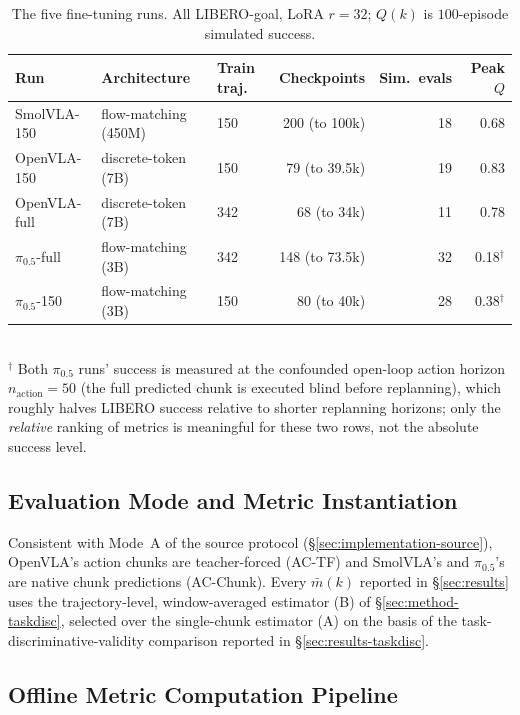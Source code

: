 \documentclass[11pt]{article}
\numberwithin{equation}{section}
\numberwithin{table}{section}
\numberwithin{figure}{section}
\begin{document}
\begin{table}[h]
\centering
\caption{The five fine-tuning runs. All LIBERO-goal, LoRA $r{=}32$; $Q(k)$ is $100$-episode simulated
success.}
\label{tab:runs}
\begin{tabular}{lllrrr}
\toprule
Run & Architecture & Train traj. & Checkpoints & Sim.\ evals & Peak $Q$ \\
\midrule
SmolVLA-150      & flow-matching (450M) & 150 & 200 (to 100k) & 18 & 0.68 \\
OpenVLA-150      & discrete-token (7B)  & 150 & 79 (to 39.5k) & 19 & 0.83 \\
OpenVLA-full     & discrete-token (7B)  & 342 & 68 (to 34k)   & 11 & 0.78 \\
$\pi_{0.5}$-full & flow-matching (3B)   & 342 & 148 (to 73.5k)& 32 & 0.18$^\dagger$ \\
$\pi_{0.5}$-150  & flow-matching (3B)   & 150 & 80 (to 40k)   & 28 & 0.38$^\dagger$ \\
\bottomrule
\end{tabular}
\\[2pt]
{\footnotesize $^\dagger$ Both $\pi_{0.5}$ runs' success is measured at the confounded open-loop action
horizon $n_{\mathrm{action}}{=}50$ (the full predicted chunk is executed blind before replanning), which
roughly halves LIBERO success relative to shorter replanning horizons; only the \emph{relative} ranking
of metrics is meaningful for these two rows, not the absolute success level.}
\end{table}

\subsection{Evaluation Mode and Metric Instantiation}
\label{sec:implementation-mode}

Consistent with Mode~A of the source protocol (\S\ref{sec:implementation-source}), OpenVLA's action
chunks are teacher-forced (AC-TF) and SmolVLA's and $\pi_{0.5}$'s are native chunk predictions
(AC-Chunk). Every $\bar m(k)$ reported in \S\ref{sec:results} uses the trajectory-level, window-averaged
estimator (B) of \S\ref{sec:method-taskdisc}, selected over the single-chunk estimator (A) on the basis
of the task-discriminative-validity comparison reported in \S\ref{sec:results-taskdisc}.

\subsection{Offline Metric Computation Pipeline}
\label{sec:implementation-pipeline}
\end{document}
